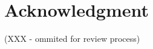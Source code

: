 \documentclass[a4paper,twoside]{article}
\begin{document}


\section*{Acknowledgment}
(XXX - ommited for review process)





%
\end{document}
